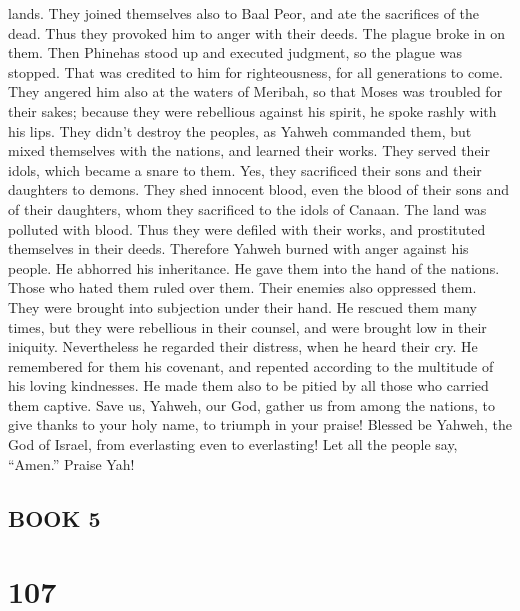 lands.  They joined themselves also to Baal Peor, and ate
the sacrifices of the dead.  Thus they provoked him to
anger with their deeds. The plague broke in on them.  Then
Phinehas stood up and executed judgment, so the plague was stopped.
 That was credited to him for righteousness, for all
generations to come.  They angered him also at the waters
of Meribah, so that Moses was troubled for their sakes; 
because they were rebellious against his spirit, he spoke rashly with
his lips.  They didn't destroy the peoples, as Yahweh
commanded them,  but mixed themselves with the nations, and
learned their works.  They served their idols, which became
a snare to them.  Yes, they sacrificed their sons and their
daughters to demons.  They shed innocent blood, even the
blood of their sons and of their daughters, whom they sacrificed to the
idols of Canaan. The land was polluted with blood.  Thus
they were defiled with their works, and prostituted themselves in their
deeds.  Therefore Yahweh burned with anger against his
people. He abhorred his inheritance.  He gave them into the
hand of the nations. Those who hated them ruled over them. 
Their enemies also oppressed them. They were brought into subjection
under their hand.  He rescued them many times, but they
were rebellious in their counsel, and were brought low in their
iniquity.  Nevertheless he regarded their distress, when he
heard their cry.  He remembered for them his covenant, and
repented according to the multitude of his loving kindnesses.
 He made them also to be pitied by all those who carried
them captive.  Save us, Yahweh, our God, gather us from
among the nations, to give thanks to your holy name, to triumph in your
praise!  Blessed be Yahweh, the God of Israel, from
everlasting even to everlasting! Let all the people say, ``Amen.''
Praise Yah!

\hypertarget{book-5}{%
\subsection{BOOK 5}\label{book-5}}

\hypertarget{section-97}{%
\section{107}\label{section-97}}

